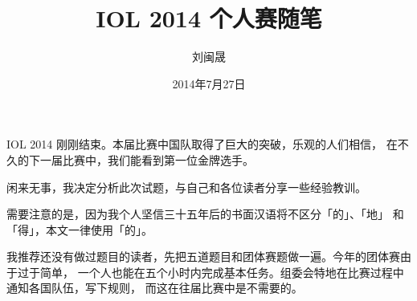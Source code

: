\documentclass[11pt]{article}
\title{IOL 2014 个人赛随笔}
\date{2014年7月27日}
\author{刘闽晟}
\newcommand \sq [1]{「#1」}
\begin{document}


\maketitle

IOL 2014 刚刚结束。本届比赛中国队取得了巨大的突破，乐观的人们相信，
在不久的下一届比赛中，我们能看到第一位金牌选手。

闲来无事，我决定分析此次试题，与自己和各位读者分享一些经验教训。

需要注意的是，因为我个人坚信三十五年后的书面汉语将不区分\sq{的}、\sq{地}
和\sq{得}，本文一律使用\sq{的}。

我推荐还没有做过题目的读者，先把五道题目和团体赛题做一遍。今年的团体赛由于过于简单，
一个人也能在五个小时内完成基本任务。组委会特地在比赛过程中通知各国队伍，写下规则，
而这在往届比赛中是不需要的。








\renewcommand \refname{引用}

\end{document}
